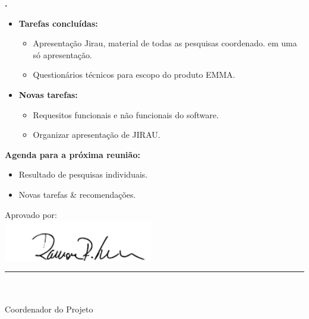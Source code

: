 	
   \textbf{\julia.} 
	\begin{itemize}
		\item \textbf{Tarefas concluídas:}
			\begin{itemize}    
				\item Apresentação Jirau, material de todas as pesquisas coordenado.
				em uma só apresentação.
				\item Questionários técnicos para escopo do produto EMMA.
			\end{itemize}
		
		\item \textbf{Novas tarefas:}
			\begin{itemize} 
			    \item Requesitos funcionais e não funcionais do software.
			    \item Organizar apresentação de JIRAU.
			\end{itemize}
	\end{itemize}		



\textbf{Agenda para a próxima reunião:}
  \begin{itemize}
    \item Resultado de pesquisas individuais.
    \item Novas tarefas \& recomendações.
  \end{itemize}


\vspace{5mm}%
\parbox[t]{70mm}{
  Aprovado por: \\[5mm]
  \centering
  \includegraphics[width=65mm]{figs/logo/assinatura-ramon.png} \\[-4mm]
  \rule[2mm]{70mm}{0.1mm} \\
  \ramon \\[1mm]
  Coordenador do Projeto \\
}

\fim